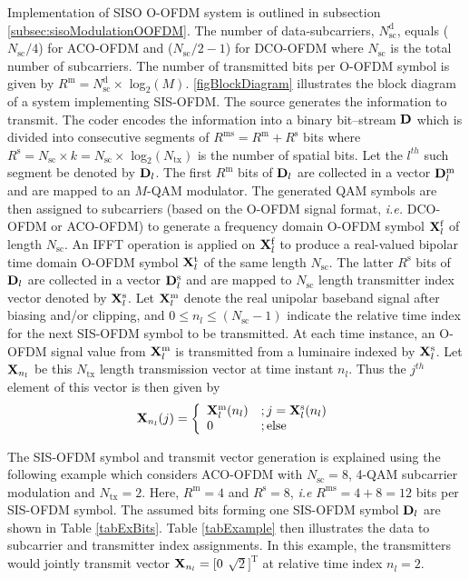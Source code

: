 Implementation of SISO O-OFDM system is outlined in subsection \ref{subsec:sisoModulationOOFDM}. The number of data-subcarriers, $N_{\text{sc}}^{\text{d}}$, equals ($N_{\text{sc}}/4$) for ACO-OFDM and ($N_{\text{sc}}/2-1$) for DCO-OFDM where $N_{\text{sc}}$ is the total number of subcarriers. The number of transmitted bits per O-OFDM symbol is given by $R^{\text{m}}=N_{\text{sc}}^{\text{d}}\times $ log$^{ }_{2}(M)$. \figurename{\ref{figBlockDiagram}} illustrates the block diagram of a system implementing SIS-OFDM. The source generates the information to transmit. The coder encodes the information into a binary bit--stream ${\bf{D}}$ which is divided into consecutive segments of $R^{\text{ms}}=R^{\text{m}}+R^{\text{s}}$ bits where $R^{\text{s}}=N_{\text{sc}}\times k=N_{\text{sc}}\times $ log$^{ }_{2}(N_{\text{tx}})$ is the number of spatial bits. Let the $l^{th}$ such segment be denoted by ${\bf{D}}_l$. The first $R^{\text{m}}$ bits of ${\bf{D}}_l$ are collected in a vector ${\bf{D}}_l^{\text{m}}$ and are mapped to an $M$-QAM modulator. The generated QAM symbols are then assigned to subcarriers (based on the O-OFDM signal format, \textit{i.e.} DCO-OFDM or ACO-OFDM) to generate a frequency domain O-OFDM symbol ${\bf{X}}_l^{\text{f}}$ of length $N_{\text{sc}}$. An IFFT operation is applied on ${\bf{X}}_l^{\text{f}}$ to produce a real-valued bipolar time domain O-OFDM symbol ${\bf{X}}_l^{\text{t}}$ of the same length $N_{\text{sc}}$. The latter $R^{\text{s}}$ bits of ${\bf{D}}_l$ are collected in a vector ${\bf{D}}_{l}^{\text{s}}$ and are mapped to $N_{\text{sc}}$ length transmitter index vector denoted by ${\bf{X}}_l^{\text{s}}$. Let ${\bf{X}}_l^{\text{m}}$ denote the real unipolar baseband signal after biasing and/or clipping, and $0\leq n_l\leq (N_{\text{sc}}-1)$ indicate the relative time index for the next SIS-OFDM symbol to be transmitted. At each time instance, an O-OFDM signal value from ${\bf{X}}_l^{\text{m}}$ is transmitted from a luminaire indexed by ${\bf{X}}_l^{\text{s}}$. Let ${\bf{X}}_{n_l}$ be this $N_{\text{tx}}$ length transmission vector at time instant $n_l$. Thus the $j^{th}$ element of this vector is then given by
\begin{equation}
	\label{eqX}
	{\bf{X}}_{n_l}(j) = \left\{ \begin{array}{ll} {\bf{X}}_l^{\text{m}}(n_l) &; j={\bf{X}}_l^{\text{s}}(n_l) \\ 0 &; \text{else} \end{array} \right.
\end{equation}

The SIS-OFDM symbol and transmit vector generation is explained using the following example which considers ACO-OFDM with $N_{\text{sc}}=8$, 4-QAM subcarrier modulation and $N_{\text{tx}}=2$. Here, $R^{\text{m}}=4$ and $R^{\text{s}}=8$, \textit{i.e} $R^{\text{ms}}=4+8=12$ bits per SIS-OFDM symbol. The assumed bits forming one SIS-OFDM symbol ${\bf{D}}_l$ are shown in Table \ref{tabExBits}. Table \ref{tabExample} then illustrates the data to subcarrier and transmitter index assignments. In this example, the transmitters would jointly transmit vector ${\bf{X}}_{n_l}=[0$ $\sqrt{2}]^{\text{T}}$ at relative time index $n_l=2$.

